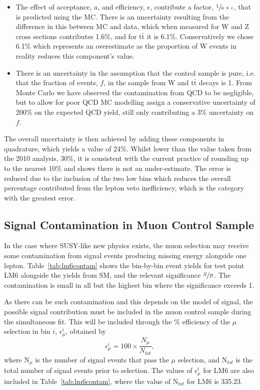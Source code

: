 \begin{itemize}
\begin{itemize}
\end{itemize}
\item The effect of acceptance, $a$, and efficiency, $\epsilon$, contribute a factor, $\sfrac{1}{a \times \epsilon}$, that is predicted using the MC. There is an uncertainty resulting from the difference in this between MC and data, which when measured for W and Z cross sections contributes 1.6\%, and for t$\bar{\textrm{t}}$ it is 6.1\%. Conservatively we chose 6.1\% which represents an overestimate as the proportion of W events in reality reduces this component's value.
\item There is an uncertainty in the assumption that the control sample is pure, i.e. that the fraction of events, $f$, in the sample from W and t$\bar{\textrm{t}}$ decays is 1. From Monte Carlo we have observed the contamination from QCD to be negligible, but to allow for poor QCD MC modelling assign a conservative uncertainty of 200\% on the expected QCD yield, still only contributing a 3\% uncertainty on $f$.
\end{itemize}

The overall uncertainty is then achieved by adding these components in quadrature, which yields a value of 24\%. Whilst lower than the value taken from the 2010 analysis, 30\%, it is consistent with the current practice of rounding up to the nearest 10\% and shows there is not an under-estimate. The error is reduced due to the inclusion of the two low \HT bins which reduces the overall percentage contributed from the lepton veto inefficiency, which is the category with the greatest error. 

\subsection{Signal Contamination in Muon Control Sample}
\label{sec:sigmucon}
In the case where SUSY-like new physics exists, the muon selection may receive some contamination from signal events producing missing energy alongside one lepton. Table~\ref{tab:lm6contam} shows the bin-by-bin event yields for test point LM6 alongside the yields from SM, and the relevant significance $\sfrac{S}{B}$. The contamination is small in all but the highest bin where the significance exceeds 1. 

As there can be such contamination and this depends on the model of signal, the possible signal contribution must be included in the muon control sample during the simultaneous fit. This will be included through the \% efficiency of the $\mu$ selection in bin $i$, $\epsilon^{i}_{\mu}$, obtained by
\begin{equation}
\epsilon^{i}_{\mu} = 100 \times \frac{N_{\mu}}{N_{tot}},
\end{equation}
where N$_{\mu}$ is the number of signal events that pass the $\mu$ selection, and N$_{tot}$ is the total number of signal events prior to selection. The values of $\epsilon^{i}_{\mu}$ for LM6 are also included in Table~\ref{tab:lm6contam}, where the value of N$_{tot}$ for LM6 is 335.23.


